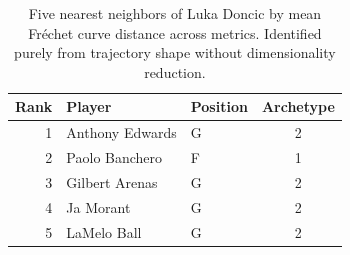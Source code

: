 \begin{table}[htbp]
  \centering\small
  \begin{tabular}{rllc}
    \toprule
    Rank & Player & Position & Archetype \\
    \midrule
    1 & Anthony Edwards & G & 2 \\
    2 & Paolo Banchero & F & 1 \\
    3 & Gilbert Arenas & G & 2 \\
    4 & Ja Morant & G & 2 \\
    5 & LaMelo Ball & G & 2 \\
    \bottomrule
  \end{tabular}
  \caption{Five nearest neighbors of Luka Doncic by mean Fr\'{e}chet curve distance across metrics. Identified purely from trajectory shape without dimensionality reduction.}
  \label{tab:Luka_Doncic_frechet_curve_neighbors}
\end{table}

